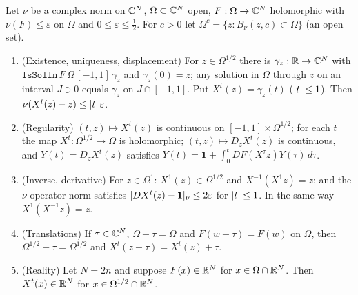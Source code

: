 \begin{lemma}\label{bpN:p5:flow}
Let $\nu$ be a complex norm on $\mathbb{C}^N$, $\Omega\subset\mathbb{C}^N$ open, $F:\Omega\to\mathbb{C}^N$ holomorphic with $\nu(F)\le\varepsilon$ on $\Omega$ and $0\le\varepsilon\le\frac12$. For $c>0$ let $\Omega^{c}=\{z:\bar B_\nu(z,c)\subset\Omega\}$ (an open set).
\begin{enumerate}[label=(\alph*)]
\item (Existence, uniqueness, displacement) For $z\in\Omega^{1/2}$ there is $\gamma_z:\mathbb{R}\to\mathbb{C}^N$ with $\texttt{IsSolIn}\,F\,\Omega\,[-1,1]\,\gamma_z$ and $\gamma_z(0)=z$; any solution in $\Omega$ through $z$ on an interval $J\ni0$ equals $\gamma_z$ on $J\cap[-1,1]$. Put $X^t(z)=\gamma_z(t)$ ($\lvert t\rvert\le1$). Then $\nu(X^t(z)-z)\le\lvert t\rvert\,\varepsilon$.
\item (Regularity) $(t,z)\mapsto X^t(z)$ is continuous on $[-1,1]\times\Omega^{1/2}$; for each $t$ the map $X^t:\Omega^{1/2}\to\Omega$ is holomorphic; $(t,z)\mapsto D_zX^t(z)$ is continuous, and $Y(t)=D_zX^t(z)$ satisfies $Y(t)=\mathbf 1+\int_0^tDF(X^\tau z)Y(\tau)\,d\tau$.
\item (Inverse, derivative) For $z\in\Omega^{1}$: $X^1(z)\in\Omega^{1/2}$ and $X^{-1}(X^1z)=z$; and the $\nu$-operator norm satisfies $\lvert DX^t(z)-\mathbf 1\rvert_\nu\le2\varepsilon$ for $\lvert t\rvert\le1$. In the same way $X^1(X^{-1}z)=z$.
\item (Translations) If $\tau\in\mathbb{C}^N$, $\Omega+\tau=\Omega$ and $F(w+\tau)=F(w)$ on $\Omega$, then $\Omega^{1/2}+\tau=\Omega^{1/2}$ and $X^t(z+\tau)=X^t(z)+\tau$.
\item (Reality) Let $N=2n$ and suppose $F(x)\in\mathbb{R}^{N}$ for $x\in\Omega\cap\mathbb{R}^N$. Then $X^t(x)\in\mathbb{R}^N$ for $x\in\Omega^{1/2}\cap\mathbb{R}^N$.
\end{enumerate}
\end{lemma}
